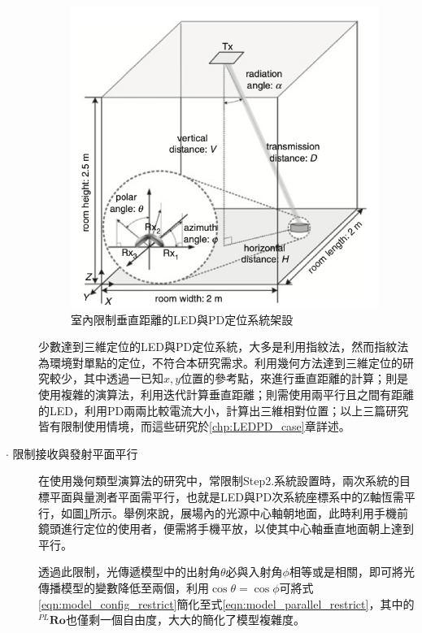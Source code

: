 \begin{description}
        \begin{figure}[htpb]
            \centering
            \includegraphics[width=10cm]{ch2pic/case_parallel.png}
            \caption{室內限制垂直距離的LED與PD定位系統架設\cite{case:aoa}}
            \label{pic:case_parallel}
        \end{figure}
        
        \qquad
        少數達到三維定位的LED與PD定位系統，大多是利用指紋法\cite{case:ml}，然而指紋法為環境對單點的定位，不符合本研究需求。利用幾何方法達到三維定位的研究較少，其中\cite{case:cart3d}透過一已知$x,y$位置的參考點，來進行垂直距離的計算；\cite{case:3d_layers}則是使用複雜的演算法，利用迭代計算垂直距離；\cite{case:hypercube}則需使用兩平行且之間有距離的LED，利用PD兩兩比較電流大小，計算出三維相對位置；以上三篇研究皆有限制使用情境，而這些研究於\ref{chp:LEDPD_case}章詳述。



        \item[$\cdot$ 限制接收與發射平面平行]   \hfill
        
        \qquad
        在使用幾何類型演算法的研究中，常限制Step2.系統設置時，兩次系統的目標平面與量測者平面需平行，也就是LED與PD次系統座標系中的Z軸恆需平行，如圖\ref{pic:case_parallel}所示。舉例來說，展場內的光源中心軸朝地面，此時利用手機前鏡頭進行定位的使用者，便需將手機平放，以使其中心軸垂直地面朝上達到平行。

        \qquad
        透過此限制，光傳遞模型中的出射角$\theta$必與入射角$\phi$相等或是相關，即可將光傳播模型的變數降低至兩個，利用$\cos\theta=\cos\phi$可將式\ref{eqn:model_config_restrict}簡化至式\ref{eqn:model_parallel_restrict}，其中的$^{PL}\boldsymbol{Ro}$也僅剩一個自由度，大大的簡化了模型複雜度。



\end{description}
